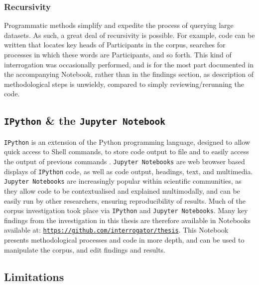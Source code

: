 \subsubsection*{Recursivity}

Programmatic methods simplify and expedite the process of querying large datasets. As such, a great deal of recursivity is possible. For example, code can be written that locates key heads of Participants in the \gls{corpus}, searches for processes in which these words are Participants, and so forth. This kind of interrogation was occasionally performed, and is for the most part documented in the accompanying Notebook, rather than in the findings section, as description of methodological steps is unwieldy, compared to simply reviewing\slash rerunning the code.

\subsection{\texttt{IPython} \& the \texttt{Jupyter Notebook}}

\texttt{IPython} is an extension of the Python programming language, designed to allow quick access to Shell commands, to store code output to file and to easily access the output of previous commands \cite{perez2007ipython}. \texttt{Jupyter Notebooks} are web browser based displays of \texttt{IPython} code, as well as code output, headings, text, and multimedia. \texttt{Jupyter Notebooks} are increasingly popular within scientific communities, as they allow code to be contextualised and explained multimodally, and can be easily run by other researchers, ensuring reproducibility of results. Much of the corpus investigation took place via \texttt{IPython} and \texttt{Jupyter Notebooks}. Many key findings from the investigation in this thesis are therefore available in Notebooks available at: \texttt{\href{https://github.com/interrogator/thesis}{https://github.com/interrogator/thesis}}. This Notebook presents methodological processes and code in more depth, and can be used to manipulate the \gls{corpus}, and edit findings and results.

\subsection{Limitations}


